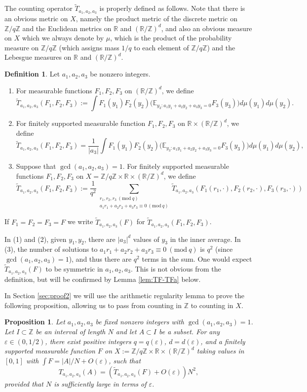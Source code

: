 \documentclass[12pt, notitlepage]{amsart}
\numberwithin{equation}{section}
\def\R{\mathbb R}
\def\Z{\mathbb Z}
\def\E{\mathbb E}
\def\wt{\widetilde}
\def\gcd{\operatorname{gcd}}
\newcommand{\eps}{\varepsilon}
\newcommand{\Mod}[1]{\ (\mathrm{mod}\ #1)}
\newtheorem{proposition}[theorem]{Proposition}
\theoremstyle{remark}
\theoremstyle{definition}
\newtheorem{definition}[theorem]{Definition}
\theoremstyle{remark}
\numberwithin{equation}{section}
\begin{document}
 The counting operator $\wt{T}_{a_1,a_2,a_3}$ is properly defined as follows. Note that there is an obvious metric on $X$, namely the product metric of the discrete metric on $\Z/q\Z$ and the Euclidean metrics on $\R$ and $(\R/\Z)^d$, and also an obvious measure on $X$ which we always denote by $\mu$, which is the product of the probability measure on $\Z/q\Z$ (which assigns mass $1/q$ to each element of $\Z/q\Z$) and the Lebesgue measures on $\R$ and $(\R/\Z)^d$.

\begin{definition}\label{def:Ttilde}
Let $a_1,a_2,a_3$ be nonzero integers.
\begin{enumerate}
\item  For measurable functions $F_1,F_2,F_3$ on $(\R/\Z)^d$, we define
$$
\wt{T}_{a_1,a_2,a_3}(F_1,F_2,F_3) := \int F_1(y_1) F_2(y_2) \Big(\E_{y_3: a_1y_1+a_2y_2+a_3y_3=0} F_3(y_3)\Big) d\mu(y_1) d\mu(y_2).
$$
\item For finitely supported measurable function $F_1,F_2,F_3$ on $\R \times (\R/\Z)^d$, we define
$$
\wt{T}_{a_1,a_2,a_3}(F_1,F_2,F_3) = \frac{1}{|a_3|}\int F_1(y_1) F_2(y_2) \Big(\E_{y_3: a_1y_1+a_2y_2+a_3y_3=0} F_3(y_3)\Big) d\mu(y_1) d\mu(y_2),
$$
\item 
Suppose that $\gcd(a_1,a_2,a_3)=1$. For finitely supported measurable functions $F_1,F_2,F_3$ on $X = \Z/q\Z \times \R \times (\R/\Z)^d$, we define
$$
\wt{T}_{a_1,a_2,a_3}(F_1,F_2,F_3) := \frac{1}{q^2} \sum_{\substack{r_1,r_2,r_3\Mod{q} \\ a_1r_1+a_2r_2+a_3r_3\equiv 0\Mod{q}}} \wt{T}_{a_1,a_2,a_3}(F_1(r_1,\cdot), F_2(r_2,\cdot), F_3(r_3,\cdot))
$$
\end{enumerate}
If $F_1=F_2=F_3 = F$ we write $\wt{T}_{a_1,a_2,a_3}(F)$ for $\wt{T}_{a_1,a_2,a_3}(F_1,F_2,F_3)$.
\end{definition}

In (1) and (2), given $y_1,y_2$, there are $|a_3|^d$ values of $y_3$ in the inner average. 
In (3), the number of solutions to $a_1r_1+a_2r_2+a_3r_3\equiv 0\Mod{q}$ is $q^2$ (since $\gcd(a_1,a_2,a_3)=1$), and thus there are $q^2$ terms in the sum. One would expect $\wt{T}_{a_1,a_2,a_3}(F)$ to be symmetric in $a_1,a_2,a_3$. This is not obvious from the definition, but will be confirmed by Lemma \ref{lem:TF-TFa} below.

In Section \ref{sec:proof2} we will use the arithmetic regularity lemma to prove the following proposition, allowing us to pass from counting in $\Z$ to counting in $X$.

\begin{proposition}\label{prop:proof2}
Let $a_1,a_2,a_3$ be fixed nonzero integers with $\gcd(a_1,a_2,a_3)=1$. Let $I \subset \Z$ be an interval of length $N$ and let $A \subset I$ be a subset. For any $\eps \in (0,1/2)$, there exist positive integers $q = q(\eps)$, $d = d(\eps)$, and a finitely supported measurable function $F$ on $X := \Z/q\Z\times \R \times (\R/\Z)^d$ taking values in $[0,1]$ with $\int F = |A|/N + O(\eps)$, such that
$$
T_{a_1,a_2,a_3}(A) = (\wt{T}_{a_1,a_2,a_3}(F) + O(\eps))N^2,
$$
provided that $N$ is sufficiently large in terms of $\eps$.
\end{proposition}
\end{document}
